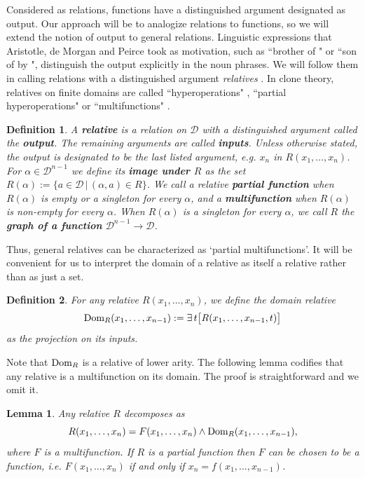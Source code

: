 \documentclass[11pt]{article}
\theoremstyle{plain}
\newtheorem{lemma}{Lemma}
\newtheorem{definition}{Definition}
\theoremstyle{definition}
\def\D{\mathcal{D}}
\def\a{\alpha}
\begin{document}
Considered as relations, functions have a distinguished argument designated as output. Our approach will be to analogize relations to functions, so we will extend the notion of output to general relations. Linguistic expressions that Aristotle, de Morgan and Peirce took as motivation, such as ``brother of \underline{\hspace{1em}}" or ``son of \underline{\hspace{1em}} by \underline{\hspace{1em}}", distinguish the output explicitly in the noun phrases. We will follow them in calling relations with a distinguished argument {\it relatives} \cite{Bur97}. In clone theory, relatives on finite domains are called ``hyperoperations" \cite{Ros96}, ``partial hyperoperations" \cite{Rom02} or ``multifunctions" \cite{Born08}. 
\begin{definition}\label{Relative}
A {\bf relative} is a relation on $\D$ with a distinguished argument called the {\bf output}. The remaining arguments are called {\bf inputs}. Unless otherwise stated, the output is designated to be the last listed argument, e.g. $x_{n}$ in $R(x_1,\dots,x_{n})$. For $\a\in\D^{n-1}$ we define its {\bf image under $R$} as the set $R(\a):=\{a\in\D\,|\,(\a,a)\in R\}$. We call a relative {\bf partial function} when $R(\a)$ is empty or a singleton for every $\a$, and a {\bf multifunction} when $R(\a)$ is non-empty for every $\a$. When $R(\a)$ is a singleton for every $\a$, we call $R$ the {\bf graph of a function} $\D^{n-1}\to\D$.
\end{definition}
\noindent Thus, general relatives can be characterized as `partial multifunctions'. It will be convenient for us to interpret the domain of a relative as itself a relative rather than as just a set.
\begin{definition}\label{RelDom}
For any relative $R(x_1,\dots,x_n)$, we define the domain relative 
$$
\textup{Dom}_R(x_1,\dots,x_{n-1}):=\exists\,t\big[R(x_1,\dots,x_{n-1},t)\big]
$$ 
as the projection on its inputs.
\end{definition}
Note that $\textup{Dom}_R$ is a relative of lower arity. The following lemma codifies that any relative is a multifunction on its domain. The proof is straightforward and we omit it.
\begin{lemma}\label{DomSplit} Any relative $R$ decomposes as
\begin{equation}\label{Fdom}
R(x_1,\dots,x_n)=F(x_1,\dots,x_n)\land\textup{Dom}_R(x_1,\dots,x_{n-1}),
\end{equation}
where $F$ is a multifunction. If $R$ is a partial function then $F$ can be chosen to be a function, i.e. $F(x_1,\dots,x_n)$ if and only if $x_n=f(x_1,\dots,x_{n-1})$.
\end{lemma}
\end{document}

